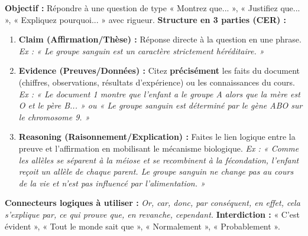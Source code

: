 \documentclass[11pt]{article}
\begin{document}
\begin{methode}
\textbf{Objectif :} Répondre à une question de type « Montrez que... », « Justifiez que... », « Expliquez pourquoi... » avec rigueur.
\textbf{Structure en 3 parties (CER) :}
\begin{enumerate}
    \item \textbf{Claim (Affirmation/Thèse) :} Réponse directe à la question en une phrase. \textit{Ex : « Le groupe sanguin est un caractère strictement héréditaire. »}
    \item \textbf{Evidence (Preuves/Données) :} Citez \textbf{précisément} les faits du document (chiffres, observations, résultats d'expérience) ou les connaissances du cours. \textit{Ex : « Le document 1 montre que l'enfant a le groupe A alors que la mère est O et le père B... » ou « Le groupe sanguin est déterminé par le gène ABO sur le chromosome 9. »}
    \item \textbf{Reasoning (Raisonnement/Explication) :} Faites le lien logique entre la preuve et l'affirmation en mobilisant le mécanisme biologique. \textit{Ex : « Comme les allèles se séparent à la méiose et se recombinent à la fécondation, l'enfant reçoit un allèle de chaque parent. Le groupe sanguin ne change pas au cours de la vie et n'est pas influencé par l'alimentation. »}
\end{enumerate}
\textbf{Connecteurs logiques à utiliser :} \emph{Or, car, donc, par conséquent, en effet, cela s'explique par, ce qui prouve que, en revanche, cependant.}
\textbf{Interdiction :} « C'est évident », « Tout le monde sait que », « Normalement », « Probablement ».
\end{methode}
\end{document}
